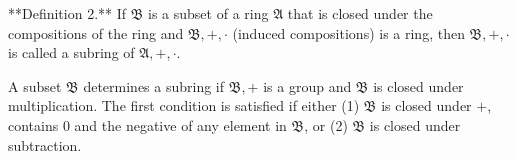 **Definition 2.** If $\mathfrak{B}$ is a subset of a ring $\mathfrak{A}$ that is closed under the compositions of the ring and $\mathfrak{B}, +, \cdot$ (induced compositions) is a ring, then $\mathfrak{B}, +, \cdot$ is called a subring of $\mathfrak{A}, +, \cdot$.

A subset $\mathfrak{B}$ determines a subring if $\mathfrak{B}, +$ is a group and $\mathfrak{B}$ is closed under multiplication. The first condition is satisfied if either (1) $\mathfrak{B}$ is closed under $+$, contains $0$ and the negative of any element in $\mathfrak{B}$, or (2) $\mathfrak{B}$ is closed under subtraction.
